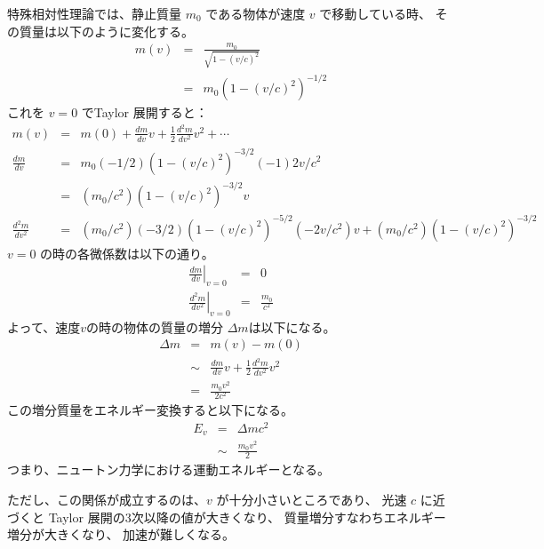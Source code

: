 特殊相対性理論では、静止質量 $m_0$ である物体が速度 $v$ で移動している時、
その質量は以下のように変化する。
  \begin{eqnarray}
    m(v) & = & \frac{m_0}{\sqrt{1 - (v/c)^2}}
  \\
         & = & m_0 (1 - (v/c)^2)^{-1/2}
  \end{eqnarray}
これを $v=0$ でTaylor 展開すると：
  \begin{eqnarray}
    m(v) & = & m(0) + \frac{d m}{d v} v + \frac{1}{2} \frac{d^2 m}{d v^2} v^2
               + \cdots
  \\
    \frac{d m}{d v} & = &
       m_0 (-1/2) (1-(v/c)^2)^{-3/2} (-1) 2v/c^2
  \\                & = &
       (m_0/c^2)(1-(v/c)^2)^{-3/2} v
  \\
    \frac{d^2 m}{d v^2} & = &
       (m_0/c^2)(-3/2)(1-(v/c)^2)^{-5/2} (-2v/c^2) v
       + (m_0/c^2)(1-(v/c)^2)^{-3/2}
  \end{eqnarray}
$v=0$ の時の各微係数は以下の通り。
  \begin{eqnarray}
    \left.\frac{d m}{d v}\right|_{v=0} & = &
       0
  \\
    \left.\frac{d^2 m}{d v^2}\right|_{v=0} & = &
       \frac{m_0}{c^2}
  \end{eqnarray}
よって、速度$v$の時の物体の質量の増分 $\Delta m$は以下になる。
  \begin{eqnarray}
    \Delta m & = & m(v) - m(0)
  \\
      & \sim &
        \frac{d m}{d v} v
        +
        \frac{1}{2} \frac{d^2 m}{d v^2} v^2
  \\
      & = &
        \frac{m_0 v^2}{2 c^2}
  \end{eqnarray}
この増分質量をエネルギー変換すると以下になる。
  \begin{eqnarray}
    E_v & = &
      \Delta m c^2
  \\
      & \sim &
        \frac{m_0 v^2}{2}
  \end{eqnarray}
つまり、ニュートン力学における運動エネルギーとなる。

ただし、この関係が成立するのは、$v$ が十分小さいところであり、
光速 $c$ に近づくと Taylor 展開の3次以降の値が大きくなり、
質量増分すなわちエネルギー増分が大きくなり、
加速が難しくなる。

